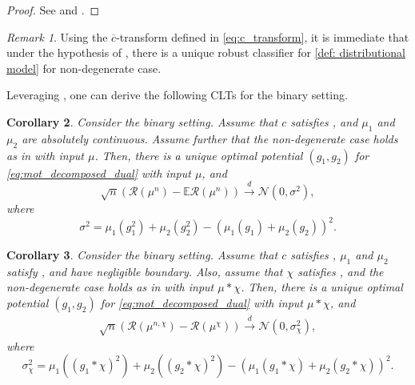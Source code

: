 \documentclass{amsart}
\theoremstyle{plain}
\numberwithin{equation}{section}\newtheorem{theorem}{Theorem}[section]
\newtheorem{corollary}[theorem]{Corollary}
\theoremstyle{remark}
\newtheorem{remark}[theorem]{Remark}
\begin{document}
\begin{proof}
See  and .    
\end{proof}




\begin{remark}
Using the $\overline{c}$-transform defined in \eqref{eq:c_transform}, it is immediate that under the hypothesis of , there is a unique robust classifier for \eqref{def: distributional model} for non-degenerate case.
\end{remark}




Leveraging , one can derive the following CLTs for the binary setting.




\begin{corollary}\label{Cor: empirical centering}
Consider the binary setting. Assume that $c$ satisfies , and $\mu_1$ and $\mu_2$ are absolutely continuous. Assume further that the non-degenerate case holds as in  with input $\mu$. Then, there is a unique optimal potential $(g_1, g_2)$ for \eqref{eq:mot_decomposed_dual} with input $\mu$, and
\[
\sqrt n\left(
\mathscr R(\mu^n)-\mathbb E\mathscr R(\mu^n)
\right)
\overset{d}{\longrightarrow}
\mathcal N(0,\sigma^2),
\]
where
\[
\sigma^2
=
\mu_1(g_1^2)+\mu_2(g_2^2)
-\left(\mu_1(g_1)+\mu_2(g_2)\right)^2.
\]
\end{corollary}





\begin{corollary}\label{Cor: smoothed centering}
Consider the binary setting. Assume that $c$ satisfies , $\mu_1$ and $\mu_2$ satisfy , and have negligible boundary. Also, assume that $\chi$ satisfies , and the non-degenerate case holds as in  with input $\mu * \chi$. Then, there is a unique optimal potential $(g_1, g_2)$ for \eqref{eq:mot_decomposed_dual} with input $\mu * \chi$, and
\begin{align*}
    \sqrt{n}(\mathscr{R}(\mu^{n, \chi})- \mathscr{R}(\mu^{\chi}) )   \overset{d}{\longrightarrow} \mathcal{N}\left(0, \sigma_\chi^2 \right),
\end{align*}
where
\[
\sigma_\chi^2
=
\mu_1((g_1 * \chi)^2)+\mu_2((g_2 * \chi)^2)
-\left(\mu_1(g_1 * \chi)+\mu_2(g_2 * \chi)\right)^2.
\]
\end{corollary}
\end{document}
